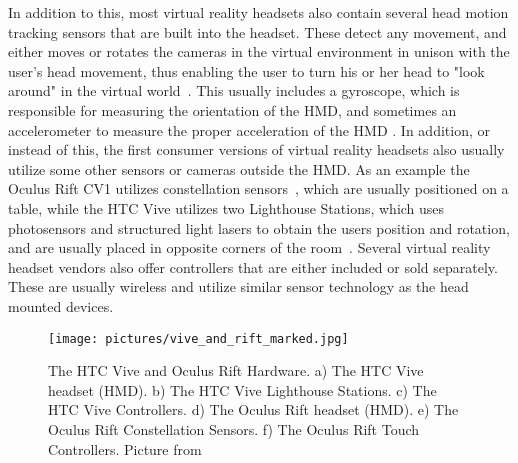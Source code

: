 In addition to this, most virtual reality headsets also contain several head motion tracking sensors that are built into the headset. 
These detect any movement, and either moves or rotates the cameras in the virtual environment in unison with the user's head movement, thus enabling the user to turn
his or her head to "look around" in the virtual world~\citep{TW2016}. This usually includes a gyroscope, which is responsible for measuring the orientation of the
HMD, and sometimes an accelerometer to measure the proper acceleration of the HMD \citep{THEVERGE2016}. In addition, or instead of this, the first consumer versions of 
virtual reality headsets also usually utilize some other sensors or cameras outside the HMD. As an example the Oculus Rift CV1 utilizes constellation sensors~\citep{VRFOCUS2015}, 
which are usually positioned on a table, while the HTC Vive utilizes two Lighthouse Stations, which uses photosensors and 
structured light lasers to obtain the users position and rotation, and are usually placed in opposite corners of the room~\citep{GIZMODO2015}. 
Several virtual reality headset vendors also offer controllers that are either included or sold separately. These are usually wireless and 
utilize similar sensor technology as the head mounted devices.    

\begin{figure}%
	\texttt{[image: pictures/vive\_and\_rift\_marked.jpg]}
	\caption[The HTC Vive and Oculus Rift Hardware]{The HTC Vive and Oculus Rift Hardware. 
    a) The HTC Vive headset (HMD). b) The HTC Vive Lighthouse Stations. c) The HTC Vive Controllers. d) The Oculus Rift headset (HMD). e) The Oculus Rift Constellation Sensors. 
    f) The Oculus Rift Touch Controllers. Picture from \citet{ROADTOVR2016}}
	\label{fig:vive_and_rift_marked}
\end{figure} 



